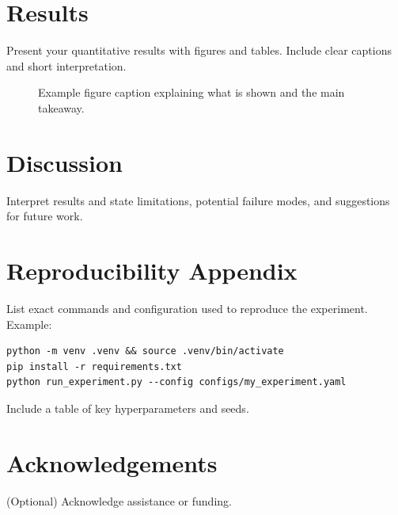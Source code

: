 \documentclass[11pt]{article}
\begin{document}
\section{Results}
Present your quantitative results with figures and tables. Include clear captions and short interpretation.

\begin{figure}[ht]
  \centering
  \caption{Example figure caption explaining what is shown and the main takeaway.}
\end{figure}

\section{Discussion}
Interpret results and state limitations, potential failure modes, and suggestions for future work.

\section{Reproducibility Appendix}
List exact commands and configuration used to reproduce the experiment. Example:
\begin{verbatim}
python -m venv .venv && source .venv/bin/activate
pip install -r requirements.txt
python run_experiment.py --config configs/my_experiment.yaml
\end{verbatim}
Include a table of key hyperparameters and seeds.

\section*{Acknowledgements}
(Optional) Acknowledge assistance or funding.



\end{document}
